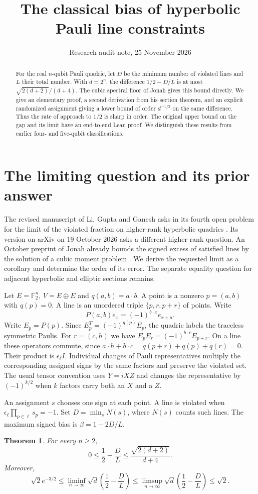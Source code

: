 \documentclass[11pt]{article}
\title{The classical bias of hyperbolic Pauli line constraints}
\author{}
\date{Research audit note, 25 November 2026}
\newtheorem{theorem}{Theorem}
\newcommand{\F}{\mathbb F_2}
\begin{document}
\maketitle
\begin{abstract}
For the real $n$-qubit Pauli quadric, let $D$ be the minimum number of violated lines and $L$ their total number. With $d=2^n$, the difference $1/2-D/L$ is at most $\sqrt{2(d+2)}/(d+4)$. The cubic spectral floor of Jonah gives this bound directly. We give an elementary proof, a second derivation from his section theorem, and an explicit randomized assignment giving a lower bound of order $d^{-1/2}$ on the same difference. Thus the rate of approach to $1/2$ is sharp in order. The original upper bound on the gap and its limit have an end-to-end Lean proof. We distinguish these results from earlier four- and five-qubit classifications.
\end{abstract}

\section{The limiting question and its prior answer}
The revised manuscript of Li, Gupta and Ganesh asks in its fourth open problem for the limit of the violated fraction on higher-rank hyperbolic quadrics \cite{lgg,lggrepo}. Its version on arXiv on 19 October 2026 asks a different higher-rank question. An October preprint of Jonah already bounds the signed excess of satisfied lines by the solution of a cubic moment problem \cite[Thms.~1,6,8]{structure}. We derive the requested limit as a corollary and determine the order of its error. The separate equality question for adjacent hyperbolic and elliptic sections remains.

Let $E=\F^n$, $V=E\oplus E$ and $q(a,b)=a\cdot b$. A point is a nonzero $p=(a,b)$ with $q(p)=0$. A line is an unordered triple $\{p,r,p+r\}$ of points. Write
\[
 P(a,b)e_x=(-1)^{b\cdot x}e_{x+a}.
\]
Write $E_p=P(p)$. Since $E_p^T=(-1)^{q(p)}E_p$, the quadric labels the traceless symmetric Paulis. For $r=(c,h)$ we have $E_pE_r=(-1)^{b\cdot c}E_{p+r}$. On a line these operators commute, since $a\cdot h+b\cdot c=q(p+r)+q(p)+q(r)=0$. Their product is $\epsilon_\ell I$. Individual changes of Pauli representatives multiply the corresponding assigned signs by the same factors and preserve the violated set. The usual tensor convention uses $Y=iXZ$ and changes the representative by $(-1)^{k/2}$ when $k$ factors carry both an $X$ and a $Z$.

An assignment $s$ chooses one sign at each point. A line is violated when $\epsilon_\ell\prod_{p\in\ell}s_p=-1$. Set $D=\min_s N(s)$, where $N(s)$ counts such lines. The maximum signed bias is $\beta=1-2D/L$.
\begin{theorem}\label{main}
For every $n\ge2$,
\[
 0\le \frac12-\frac DL\le \frac{\sqrt{2(d+2)}}{d+4}.
\]
Moreover,
\[
 \sqrt2 e^{-3/2}\le
 \liminf_{n\to\infty} \sqrt d\left(\frac12-\frac DL\right)
 \le\limsup_{n\to\infty} \sqrt d\left(\frac12-\frac DL\right)\le \sqrt2.
\]
\end{theorem}
\end{document}
